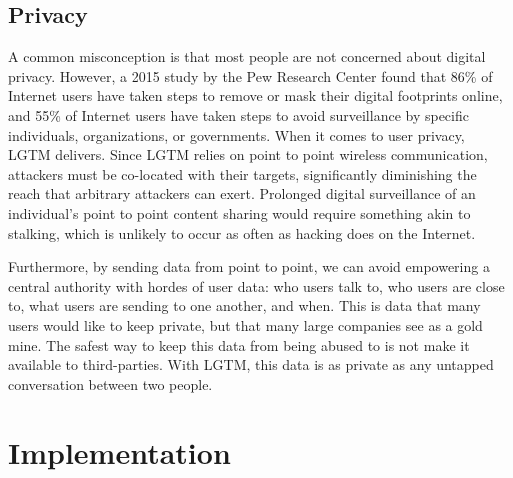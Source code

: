 \documentclass[12pt]{report}
\begin{document}



\section{Privacy} %
A common misconception is that most people are not concerned about digital privacy. However, a 2015 study by the Pew Research Center \cite{AmericanPrivacyOnlinePew2015} found that 86\% of Internet users have taken steps to remove or mask their digital footprints online, and 55\% of Internet users have taken steps to avoid surveillance by specific individuals, organizations, or governments. When it comes to user privacy, LGTM delivers. Since LGTM relies on point to point wireless communication, attackers must be co-located with their targets, significantly diminishing the reach that arbitrary attackers can exert. Prolonged digital surveillance of an individual's point to point content sharing would require something akin to stalking, which is unlikely to occur as often as hacking does on the Internet. \par

Furthermore, by sending data from point to point, we can avoid empowering a central authority with hordes of user data: who users talk to, who users are close to, what users are sending to one another, and when. This is data that many users would like to keep private, but that many large companies see as a gold mine. The safest way to keep this data from being abused to is not make it available to third-parties. With LGTM, this data is as private as any untapped conversation between two people. \par


\chapter{Implementation}
\end{document}
